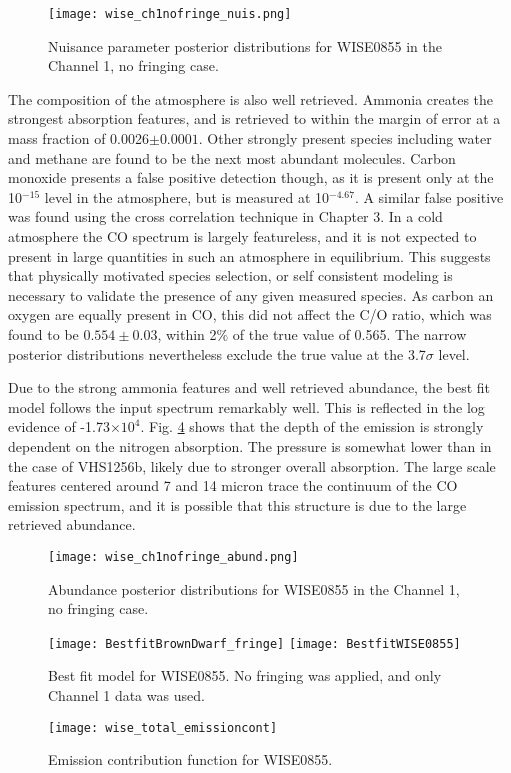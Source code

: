\begin{figure}[h]
	\texttt{[image: wise\_ch1nofringe\_nuis.png]}
	\caption{Nuisance parameter posterior distributions for WISE0855 in the Channel 1, no fringing case.}
	\label{fig:postWISEnuis}
\end{figure}

The composition of the atmosphere is also well retrieved.
Ammonia creates the strongest absorption features, and is retrieved to within the margin of error at a mass fraction of 0.0026$\pm0.0001$.
Other strongly present species including water and methane are found to be the next most abundant molecules.
Carbon monoxide presents a false positive detection though, as it is present only at the 10$^{-15}$ level in the atmosphere, but is measured at 10$^{-4.67}$.
A similar false positive was found using the cross correlation technique in Chapter 3.
In a cold atmosphere the CO spectrum is largely featureless, and it is not expected to present in large quantities in such an atmosphere in equilibrium.
This suggests that physically motivated species selection, or self consistent modeling is necessary to validate the presence of any given measured species.
As carbon an oxygen are equally present in CO, this did not affect the C/O ratio, which was found to be $0.554\pm0.03$, within 2\% of the true value of 0.565.
The narrow posterior distributions nevertheless exclude the true value at the 3.7$\sigma$ level.

Due to the strong ammonia features and well retrieved abundance, the best fit model follows the input spectrum remarkably well.
This is reflected in the log evidence of -1.73$\times10^{4}$.
Fig. \ref{fig:WISEemcont} shows that the depth of the emission is strongly dependent on the nitrogen absorption. 
The pressure is somewhat lower than in the case of VHS1256b, likely due to stronger overall absorption. 
The large scale features centered around 7 and 14 micron trace the continuum of the CO emission spectrum, and it is possible that this structure is due to the large retrieved abundance.
\begin{figure}[h]
	\texttt{[image: wise\_ch1nofringe\_abund.png]}
	\caption{Abundance posterior distributions for WISE0855 in the Channel 1, no fringing case.}
	\label{fig:postWISEabund}
\end{figure}
\begin{figure}[h]
	\texttt{[image: BestfitBrownDwarf\_fringe]}
	\texttt{[image: BestfitWISE0855]}
	\caption{Best fit model for WISE0855. No fringing was applied, and only Channel 1 data was used.}
	\label{fig:bestfitWISE}
\end{figure}
\begin{figure}[h]
	\texttt{[image: wise\_total\_emissioncont]}
	\caption{Emission contribution function for WISE0855.}
	\label{fig:WISEemcont}
\end{figure}
\clearpage
